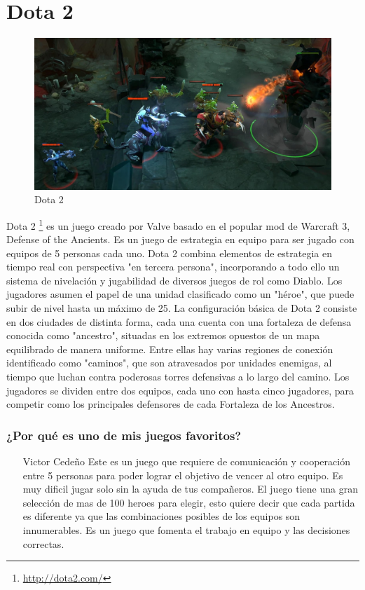 \section{Dota 2}

\begin{figure}[htbp]
\begin{center}
\includegraphics[width=.60\textwidth]{./imagenes/dota2.jpg}
\caption{Dota 2}
\label{Dota 2}
\end{center}
\end{figure}
Dota 2 \footnote{\url{http://dota2.com/}} es un juego creado por Valve basado en el popular mod de Warcraft 3, Defense of the Ancients. Es un juego de estrategia en equipo para ser jugado con equipos de 5 personas cada uno.
Dota 2 combina elementos de estrategia en tiempo real con perspectiva "en tercera persona", incorporando a todo ello un sistema de nivelación y jugabilidad de diversos juegos de rol como Diablo. Los jugadores asumen el papel de una unidad clasificado como un "héroe", que puede subir de nivel hasta un máximo de 25. La configuración básica de Dota 2 consiste en dos ciudades de distinta forma, cada una cuenta con una fortaleza de defensa conocida como "ancestro", situadas en los extremos opuestos de un mapa equilibrado de manera uniforme. Entre ellas hay varias regiones de conexión identificado como "caminos", que son atravesados por unidades enemigas, al tiempo que luchan contra poderosas torres defensivas a lo largo del camino. Los jugadores se dividen entre dos equipos, cada uno con hasta cinco jugadores, para competir como los principales defensores de cada Fortaleza de los Ancestros.

\subsubsection{¿Por qué es uno de mis juegos favoritos?}
\begin{itemize}
\item[Victor Cedeño] Este es un juego que requiere de comunicación y cooperación entre 5 personas para poder lograr el objetivo de vencer al otro equipo. Es muy dificil jugar solo sin la ayuda de tus compañeros. El juego tiene una gran selección de mas de 100 heroes para elegir, esto quiere decir que cada partida es diferente ya que las combinaciones posibles de los equipos son innumerables. Es un juego que fomenta el trabajo en equipo y las decisiones correctas.
\end{itemize}